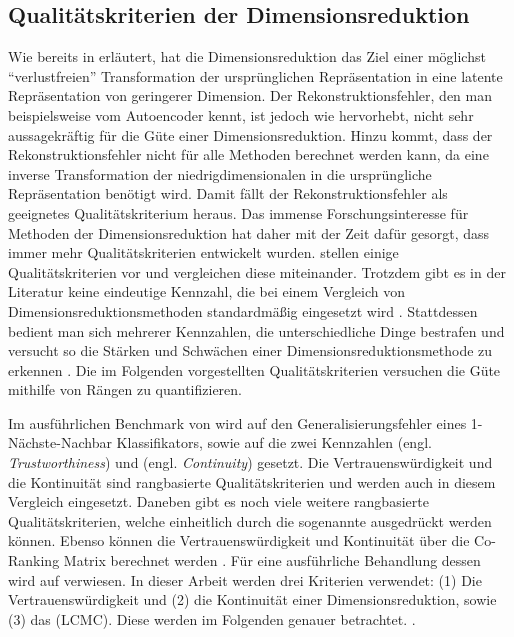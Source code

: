\subsection{Qualitätskriterien der Dimensionsreduktion}
\label{ch:Vergleich:sec:Methodik:subsec:Qualitaetskriterien}
Wie bereits in  erläutert, hat die Dimensionsreduktion das Ziel einer möglichst \enquote{verlustfreien} Transformation der ursprünglichen Repräsentation in eine latente Repräsentation von geringerer Dimension. Der Rekonstruktionsfehler, den man beispielsweise vom Autoencoder kennt, ist jedoch wie \textcite[18]{vanderMaaten.2009} hervorhebt, nicht sehr aussagekräftig für die Güte einer Dimensionsreduktion. Hinzu kommt, dass der Rekonstruktionsfehler nicht für alle Methoden berechnet werden kann, da eine inverse Transformation der niedrigdimensionalen in die ursprüngliche Repräsentation benötigt wird. Damit fällt der Rekonstruktionsfehler als geeignetes Qualitätskriterium heraus. Das immense Forschungsinteresse für Methoden der Dimensionsreduktion hat daher mit der Zeit dafür gesorgt, dass immer mehr Qualitätskriterien entwickelt wurden. \textcite{Gracia.2014} stellen einige Qualitätskriterien vor und vergleichen diese miteinander. Trotzdem gibt es in der Literatur keine eindeutige Kennzahl, die bei einem Vergleich von Dimensionsreduktionsmethoden standardmäßig eingesetzt wird \parencite[vgl.][1 -- 2]{Lee.2009}. Stattdessen bedient man sich mehrerer Kennzahlen, die
unterschiedliche Dinge bestrafen und versucht so die Stärken und Schwächen einer
Dimensionsreduktionsmethode zu erkennen \parencite[486]{Venna.2001}. Die im Folgenden vorgestellten Qualitätskriterien versuchen die Güte
mithilfe von Rängen zu quantifizieren.

Im ausführlichen Benchmark von \textcite{vanderMaaten.2009} wird auf den Generalisierungsfehler
eines 1-Nächste-Nachbar Klassifikators, sowie auf die zwei Kennzahlen
 (engl. \textit{Trustworthiness}) und  (engl.
\textit{Continuity}) \parencites{Venna.2001}{Venna.2006} gesetzt. Die Vertrauenswürdigkeit und die Kontinuität sind
rangbasierte Qualitätskriterien und werden auch in diesem Vergleich eingesetzt. Daneben gibt es
noch viele weitere rangbasierte Qualitätskriterien, welche einheitlich durch die sogenannte
 \parencite[1432]{Lee.2009} ausgedrückt werden können. Ebenso können die Vertrauenswürdigkeit und
Kontinuität über die Co-Ranking Matrix berechnet werden \parencite[1433]{Lee.2009}. Für eine ausführliche Behandlung dessen wird auf \textcite{Lee.2009}
verwiesen. In dieser Arbeit werden drei Kriterien verwendet: (1) Die Vertrauenswürdigkeit und (2)
die Kontinuität einer Dimensionsreduktion, sowie (3) das 
(LCMC). Diese werden im Folgenden genauer betrachtet. .
